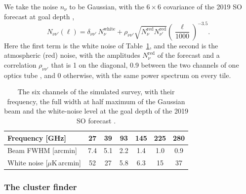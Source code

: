 We take the noise $n_\nu$ to be Gaussian, with the $6\times6$ covariance of the 2019 SO forecast at goal
depth \citep{SO2019},
\begin{equation}
N_{\nu\nu'}(\ell) = \delta_{\nu\nu'}\,N^\mathrm{white}_\nu
+ \rho_{\nu\nu'}\sqrt{N^\mathrm{red}_\nu N^\mathrm{red}_{\nu'}}\left(\frac{\ell}{1000}\right)^{-3.5}.
\label{eq:noise}
\end{equation}
Here the first term is the white noise of Table~\ref{tab:instrument}, and the second is the atmospheric (red)
noise, with the amplitudes $N^\mathrm{red}_\nu$ of the forecast and a correlation $\rho_{\nu\nu'}$ that is
1 on the diagonal, 0.9 between the two channels of one optics tube \citep{SO2019}, and 0 otherwise, with
the same power spectrum on every tile.

\begin{table}
\centering
\caption{The six channels of the simulated survey, with their frequency, the full width at half maximum of
the Gaussian beam and the white-noise level at the goal depth of the 2019 SO forecast \citep{SO2019}.}
\label{tab:instrument}
\small
\setlength{\tabcolsep}{4pt}
\begin{tabular}{lcccccc}
\toprule
Frequency [GHz]                         & 27  & 39  & 93  & 145 & 225 & 280 \\
\midrule
Beam FWHM [arcmin]                      & 7.4 & 5.1 & 2.2 & 1.4 & 1.0 & 0.9 \\
White noise [$\mu$K\,arcmin]            & 52  & 27  & 5.8 & 6.3 & 15  & 37  \\
\bottomrule
\end{tabular}
\end{table}

\subsubsection{The cluster finder}

